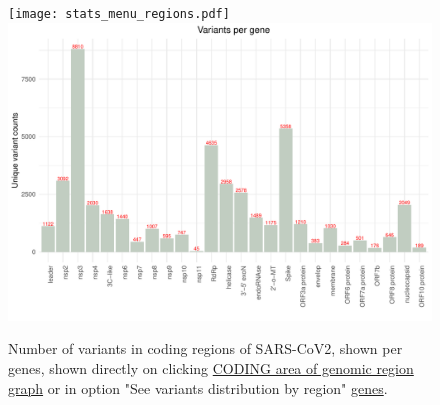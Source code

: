 \documentclass[a4paper, 10pt]{article}        %
\begin{document}
     
        






\newpage


     \begin{figure}[!h]
     \centering
   \texttt{[image: stats\_menu\_regions.pdf]}
            \includegraphics[width=1\textwidth]{variants_per_gene.pdf}
     \caption{Number of variants in coding regions of SARS-CoV2, shown per genes, shown directly  on clicking \underline{CODING area of genomic region graph} or in option "See variants distribution by region" {\color{blue}\underline{genes}}.
}
\label{fig:genes}
     \end{figure}
\end{document}
